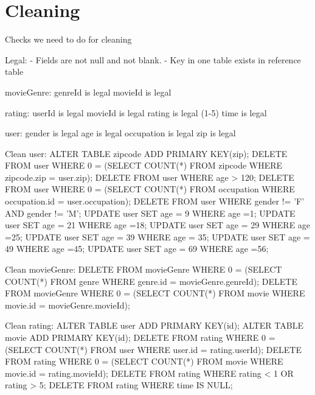 \section{Cleaning}
\begin{spverbatim}
Checks we need to do for cleaning

Legal:
- Fields are not null and not blank.
- Key in one table exists in reference table

movieGenre:
  genreId is legal
  movieId is legal

rating:
  userId is legal
  movieId is legal
  rating is legal (1-5)
  time is legal

user:
  gender is legal
  age is legal
  occupation is legal
  zip is legal

Clean user:
  ALTER TABLE zipcode ADD PRIMARY KEY(zip);
  DELETE FROM user WHERE 0 = (SELECT COUNT(*) FROM zipcode WHERE zipcode.zip = user.zip);
  DELETE FROM user WHERE age > 120;
  DELETE FROM user WHERE 0 = (SELECT COUNT(*) FROM occupation WHERE occupation.id = user.occupation);
  DELETE FROM user WHERE gender != 'F' AND gender != 'M';
  UPDATE user SET age = 9 WHERE age =1;
  UPDATE user SET age = 21 WHERE age =18;
  UPDATE user SET age = 29 WHERE age =25;
  UPDATE user SET age = 39 WHERE age = 35;
  UPDATE user SET age = 49 WHERE age =45;
  UPDATE user SET age = 69 WHERE age =56;

Clean movieGenre:
  DELETE FROM movieGenre WHERE 0 = (SELECT COUNT(*) FROM genre WHERE genre.id = movieGenre.genreId);
  DELETE FROM movieGenre WHERE 0 = (SELECT COUNT(*) FROM movie WHERE movie.id = movieGenre.movieId);
 
Clean rating:
  ALTER TABLE user ADD PRIMARY KEY(id);
  ALTER TABLE movie ADD PRIMARY KEY(id);
  DELETE FROM rating WHERE 0 = (SELECT COUNT(*) FROM user WHERE user.id = rating.userId);
  DELETE FROM rating WHERE 0 = (SELECT COUNT(*) FROM movie WHERE movie.id = rating.movieId);
  DELETE FROM rating WHERE rating < 1 OR rating > 5;
  DELETE FROM rating WHERE time IS NULL;
  \end{spverbatim}
  \newpage
